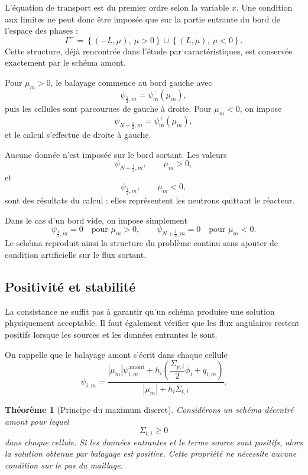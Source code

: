 \documentclass{article}
\newtheorem{theorem}{Théorème}[section]
\begin{document}
L'équation de transport est du premier ordre selon la variable $x$. Une condition aux limites ne peut donc être imposée que sur la partie entrante du bord de l'espace des phases :
\[
    \Gamma^- =\left\{ (-L,\mu),\ \mu>0 \right\}
    \cup \left\{ (L,\mu),\ \mu<0 \right\}.
\]
Cette structure, déjà rencontrée dans l'étude par caractéristiques, est
conservée exactement par le schéma amont.

Pour $\mu_m>0$, le balayage commence au bord gauche avec
\[
    \psi_{\frac12,m}
    =
    \psi_{\mathrm{in}}^{-}(\mu_m),
\]
puis les cellules sont parcourues de gauche à droite. Pour $\mu_m<0$,
on impose
\[
    \psi_{N+\frac12,m} = \psi_{\mathrm{in}}^{+}(\mu_m),
\]
et le calcul s'effectue de droite à gauche.

Aucune donnée n'est imposée sur le bord sortant. Les valeurs
\[
    \psi_{N+\frac12,m}, \qquad \mu_m>0,
\]
et
\[
    \psi_{\frac12,m}, \qquad \mu_m<0,
\]
sont des résultats du calcul : elles représentent les neutrons quittant le réacteur.

Dans le cas d'un bord vide, on impose simplement
\[
    \psi_{\frac12,m}=0 \quad\text{pour }\mu_m>0,  \qquad
    \psi_{N+\frac12,m}=0 \quad\text{pour }\mu_m<0.
\]
Le schéma reproduit ainsi la structure du problème continu sans ajouter de condition artificielle sur le flux sortant.

\subsection {Positivité et stabilité}

La consistance ne suffit pas à garantir qu'un schéma produise une solution physiquement acceptable. Il faut également vérifier que les flux angulaires restent positifs lorsque les sources et les données entrantes le sont.

On rappelle que le balayage amont s'écrit dans chaque cellule
\begin{equation}
    \psi_{i,m}
    = \frac{
        |\mu_m|\psi_{i,m}^{\mathrm{amont}}
        + h_i \left(
            \dfrac{\Sigma_{p,i}}{2}\phi_i
            +q_{i,m}
        \right)
    }{|\mu_m|+h_i\Sigma_{t,i}}.
    \label{eq:formule-positivite-upwind}
\end{equation}

\begin{theorem}[Principe du maximum discret]
    Considérons un schéma décentré amont pour lequel
    \[
        \Sigma_{t,i}\geq0
    \]
    dans chaque cellule. Si les données entrantes et le terme source sont positifs, alors la solution obtenue par balayage est positive. Cette propriété ne nécessite aucune condition sur le pas du maillage.
\end{theorem}
\end{document}
